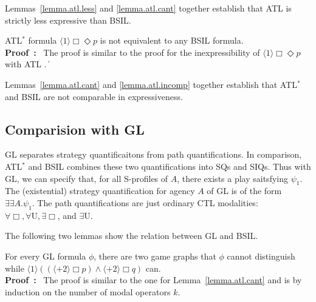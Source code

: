 \documentclass[11pt]{article}
\newcommand{\existsb}{\mbox{$\exists\!\!\exists$}}
\newcommand{\pf}{\noindent\mbox{\bf Proof : }}
\newcommand{\pfrr}{\Box}
\newcommand{\until}{\textrm{U}} %
\newcommand{\pevt}{\Diamond}
\def\qed{\ifmmode\|\else{\unskip\nobreak\hfil
\penalty50\hskip1em\null\nobreak\hfil$\blacksquare$
\parfillskip=0pt\finalhyphendemerits=0\endgraf}\fi}
\begin{document}
Lemmas~\ref{lemma.atl.less} and \ref{lemma.atl.cant} together establish  
that ATL is strictly less expressive than BSIL. 


{\lemma \label{lemma.atl.incomp}
ATL$^*$ formula $\langle 1\rangle\pfrr\pevt p$
is not equivalent to any BSIL formula.
} 
\\\pf 
The proof is similar to the proof for the inexpressibility of 
$\langle 1\rangle\pfrr\pevt p$ with ATL \cite{AHK02}.  
\qed 

Lemmas~\ref{lemma.atl.cant} and \ref{lemma.atl.incomp}
together establish  
that ATL$^*$ and BSIL are not comparable in expressiveness. 





\subsection{Comparision with GL\label{subsec.exp.gl}} 

GL separates strategy quantificaitons from path quantifications.  
In comparison, ATL$^*$ and BSIL combines these two quantifications 
into SQs and SIQs.  
Thus with GL, we can specify that, for all S-profiles of $A$, 
there exists a play saitsfying $\psi_1$.  
The (existential) strategy quantification for agency $A$ 
of GL is of the form $\existsb A.\psi_1$.  
The path quantifications are just ordinary CTL modalities: 
$\forall\pfrr, \forall\until, \exists\pfrr$, and 
$\exists\until$.  

The following two lemmas show the relation between GL and BSIL.  

{\lemma \label{lemma.gl.cant}
For every GL formula $\phi$,
there are two game graphs that
$\phi$ cannot distinguish while \linebreak 
$\langle 1\rangle ((\langle+ 2\rangle\pfrr p)
    \wedge \langle+ 2\rangle\pfrr q)$ can.
}
\\\pf 
The proof is similar to the one for Lemma~\ref{lemma.atl.cant} 
and is by induction on the number of modal operators $k$.  
\end{document}

